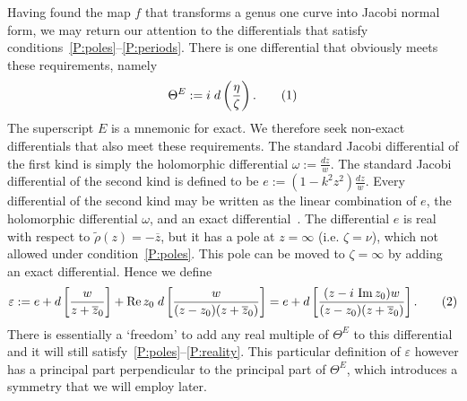 \documentclass{article}
\numberwithin{equation}{section}
\numberwithin{figure}{section}
\newcommand{\labelthis}[1]{\addtocounter{equation}{1}\tag{\theequation}\label{#1}}
\renewcommand*{\bar}{\overline}
\newcommand{\abs}[1]{\left|#1\right|}
\DeclareMathOperator{\Real}{Re}
\DeclareMathOperator{\Imag}{Im}
\newcommand{\iu}{i}
\begin{document}
Having found the map $f$ that transforms a genus one curve into Jacobi normal form, we may return our attention to the differentials that satisfy conditions~\ref{P:poles}--\ref{P:periods}.
There is one differential that obviously meets these requirements, namely
\[
\Theta^E := \iu\; d\left( \frac{\eta}{\zeta} \right).
\labelthis{eqn:thetaE}
\]
The superscript $E$ is a mnemonic for exact. We therefore seek non-exact differentials that also meet these requirements.
The standard Jacobi differential of the first kind is simply the holomorphic differential $\omega := \tfrac{dz}{w}$.
The standard Jacobi differential of the second kind is defined to be
$e := (1-k^2 z^2) \tfrac{dz}{w}$.
Every differential of the second kind may be written as the linear combination of $e$, the holomorphic differential $\omega$, and an exact differential~\cite[Art. 167]{Hancock1910}.
The differential $e$ is real with respect to $\tilde{\rho}(z) = -\bar{z}$, but it has a pole at $z=\infty$ (i.e. $\zeta=\nu$), which not allowed under condition~\ref{P:poles}. This pole can be moved to $\zeta=\infty$ by adding an exact differential. Hence we define 
\[
\varepsilon := e + d\left[ \frac{w}{z + \bar{z}_0} \right] + \Real z_0\; d\left[ \frac{w}{(z-z_0)(z + \bar{z}_0)} \right]
= e + d\left[ \frac{(z - \iu\,\Imag z_0)w}{(z-z_0)(z + \bar{z}_0)} \right].
\labelthis{eqn:def_varepsilon}
\]
There is essentially a `freedom' to add any real multiple of $\Theta^E$ to this differential and it will still satisfy~\ref{P:poles}--\ref{P:reality}. This particular definition of $\varepsilon$ however has a principal part perpendicular to the principal part of $\Theta^E$, which introduces a symmetry that we will employ later.
\end{document}
